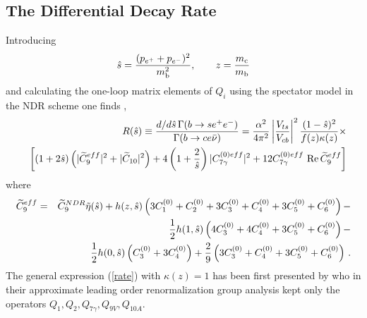 \subsection{The Differential Decay Rate}
         \label{sec:Heff:BXsee:nlo:rate}
Introducing
\begin{equation} \label{invleptmass}
\hat s = \frac{(p_{e^+} + p_{e^-})^2}{m_{\rm b}^2}, \qquad z =
\frac{m_{\rm c}}{m_{\rm b}}
\end{equation}
and calculating the one-loop matrix elements of $Q_i$ using the
spectator model in the NDR scheme one finds \cite{misiak:94},
\cite{burasmuenz:95}
\begin{eqnarray} \label{rate}
& &
R(\hat s) \equiv \frac{{d}/{d\hat s} \, \Gamma (b \to s e^+ e^-)}{\Gamma
(b \to c e \bar\nu)} = \frac{\alpha^2}{4\pi^2}
\left|\frac{V_{ts}}{V_{cb}}\right|^2 \frac{(1-\hat s)^2}{f(z)\kappa(z)}
\times \\ 
& &
\biggl[(1+2\hat s)\left(|\widetilde C_9^{eff}|^2 + |\widetilde C_{10}|^2\right) + 
4 \left( 1 + \frac{2}{\hat s}\right) |C_{7\gamma}^{(0)eff}|^2 + 12
C_{7\gamma}^{(0)eff} \ {\rm Re}\,\widetilde C_9^{eff}  \biggr]
\nonumber
\end{eqnarray}
where
\begin{eqnarray} \label{C9eff}
\widetilde C_9^{eff} & = & \widetilde C_9^{NDR} \tilde\eta(\hat s) + h(z, \hat
s)\left( 3 C_1^{(0)} + C_2^{(0)} + 3 C_3^{(0)} + C_4^{(0)} + 3
C_5^{(0)} + C_6^{(0)} \right) - \nonumber \\
& & \frac{1}{2} h(1, \hat s) \left( 4 C_3^{(0)} + 4 C_4^{(0)} + 3
C_5^{(0)} + C_6^{(0)} \right) - \\
& & \frac{1}{2} h(0, \hat s) \left( C_3^{(0)} + 3 C_4^{(0)} \right) +
\frac{2}{9} \left( 3 C_3^{(0)} + C_4^{(0)} + 3 C_5^{(0)} + C_6^{(0)}
\right) \, .
\nonumber
\end{eqnarray}
The general expression (\ref{rate}) with $\kappa(z)=1$ has been first
presented by \cite{grinstein:89a} who in their approximate leading
order renormalization group analysis kept only the operators $Q_1, Q_2,
Q_{7\gamma},Q_{9V}, Q_{10A}$.

